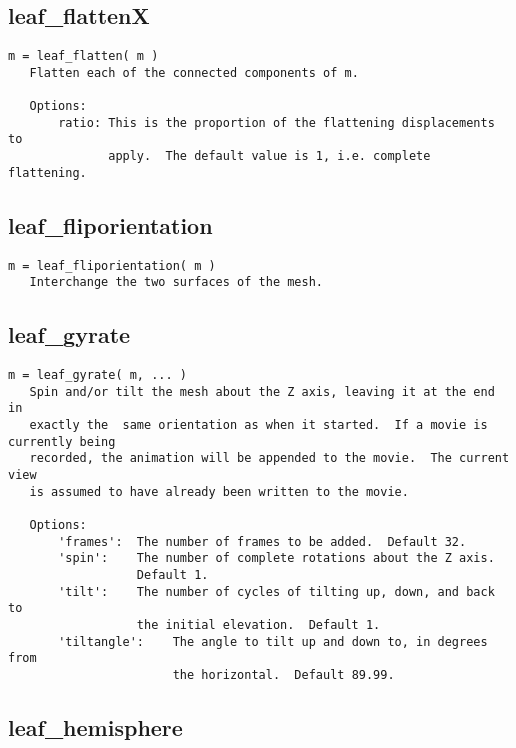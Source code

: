 \subsection{leaf\_flattenX}\label{section-leaf-flattenX}

\begin{verbatim}
m = leaf_flatten( m )
   Flatten each of the connected components of m.

   Options:
       ratio: This is the proportion of the flattening displacements to
              apply.  The default value is 1, i.e. complete flattening.
\end{verbatim}

\subsection{leaf\_fliporientation}\label{section-leaf-fliporientation}

\begin{verbatim}
m = leaf_fliporientation( m )
   Interchange the two surfaces of the mesh.
\end{verbatim}

\subsection{leaf\_gyrate}\label{section-leaf-gyrate}

\begin{verbatim}
m = leaf_gyrate( m, ... )
   Spin and/or tilt the mesh about the Z axis, leaving it at the end in
   exactly the  same orientation as when it started.  If a movie is currently being
   recorded, the animation will be appended to the movie.  The current view
   is assumed to have already been written to the movie.

   Options:
       'frames':  The number of frames to be added.  Default 32.
       'spin':    The number of complete rotations about the Z axis.
                  Default 1.
       'tilt':    The number of cycles of tilting up, down, and back to
                  the initial elevation.  Default 1.
       'tiltangle':    The angle to tilt up and down to, in degrees from
                       the horizontal.  Default 89.99.
\end{verbatim}

\subsection{leaf\_hemisphere}\label{section-leaf-hemisphere}

